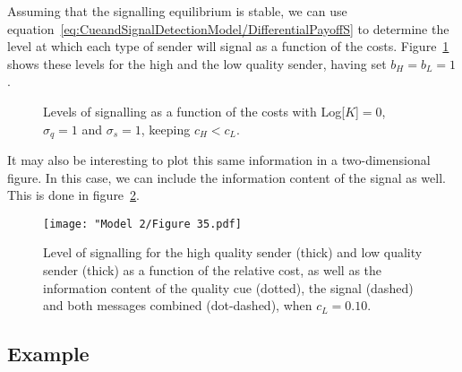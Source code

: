 \documentclass[a4paper,12pt]{article}
\numberwithin{equation}{section}
\begin{document}
Assuming that the signalling equilibrium is stable, we can use equation~\ref{eq:CueandSignalDetectionModel/DifferentialPayoffS} to determine the level at which each type of sender will signal as a function of the costs. Figure~\ref{fig:Model 2/Figure 3334} shows these levels for the high and the low quality sender, having set $b_{H}=b_{L}=1$.
\begin{figure}[h]
\captionsetup{width=380pt}
\begin{center}
\hspace{4mm}
\caption{Levels of signalling as a function of the costs with Log[$K$]$=0$, $\sigma_{q}=1$ and $\sigma_{s}=1$, keeping $c_{H}<c_{L}$.}
\label{fig:Model 2/Figure 3334}
\end{center}
\end{figure}

\newpage

It may also be interesting to plot this same information in a two-dimensional figure. In this case, we can include the information content of the signal as well. This is done in figure~\ref{fig:Model 2/Figure 35.pdf}.
\begin{figure}[h]
\captionsetup{width=300pt}
\begin{center}
\leavevmode
\texttt{[image: "Model 2/Figure 35.pdf]}
\caption{Level of signalling for the high quality sender (thick) and low quality sender (thick) as a function of the relative cost, as well as the information content of the quality cue (dotted), the signal (dashed) and both messages combined (dot-dashed), when $c_{L}=0.10$.}
\label{fig:Model 2/Figure 35.pdf}
\end{center}
\end{figure}


\subsection{Example}
\label{sec:CueandSignalDetectionModel/Example}
\end{document}
